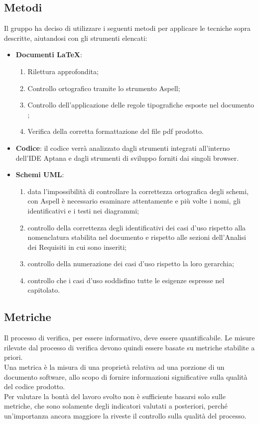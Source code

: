 {\subsection{Metodi}{
	\label{sec:Metodi}
	Il gruppo ha deciso di utilizzare i seguenti metodi per applicare le tecniche sopra descritte, aiutandosi con gli strumenti elencati:
	\begin{itemize}
		\item \textbf{Documenti \LaTeX}:
		\begin{enumerate}
			\item Rilettura approfondita;
			\item Controllo ortografico tramite lo strumento Aspell;
			\item Controllo dell'applicazione delle regole tipografiche esposte nel documento  \href{run:../../Interni/\fNormeDiProgetto}{\fEscapeNormeDiProgetto};
			\item Verifica della corretta formattazione del file pdf prodotto.
		\end{enumerate}
		
		\item \textbf{Codice}: il codice verrà analizzato dagli strumenti integrati all'interno dell'IDE Aptana e dagli strumenti di sviluppo forniti dai singoli browser.
		
		\item \textbf{Schemi UML}:
		\begin{enumerate}
			\item data l'impossibilità di controllare la correttezza ortografica degli schemi, con Aspell è necessario esaminare attentamente e più volte i nomi, gli identificativi e i testi nei diagrammi;
			\item controllo della correttezza degli identificativi dei casi d'uso rispetto alla nomenclatura stabilita nel documento \NormeDiProgetto e rispetto alle sezioni dell'Analisi dei Requisiti in cui sono inseriti;
			\item controllo della numerazione dei casi d'uso rispetto la loro gerarchia;
			\item controllo che i casi d'uso soddisfino tutte le esigenze espresse nel capitolato.
		\end{enumerate}
	\end{itemize}
	}
\subsection{Metriche}{
	\label{sec:metriche}
	Il processo di verifica, per essere informativo, deve essere quantificabile. Le misure rilevate dal processo di verifica devono quindi essere basate su metriche stabilite a priori. \\
	Una metrica è la misura di una proprietà relativa ad una porzione di un documento software, allo scopo di fornire informazioni significative sulla qualità del codice prodotto. \\
	Per valutare la bontà del lavoro svolto non è sufficiente basarsi solo sulle metriche, che sono solamente degli indicatori valutati a posteriori, perché un'importanza ancora maggiore la riveste il controllo sulla qualità del processo.
	}
}
